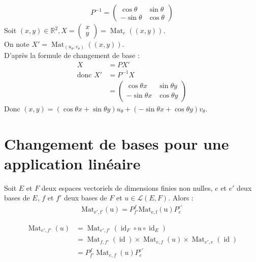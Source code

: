 \documentclass[../main.tex]{subfiles}
\begin{document}
\begin{align*}
    P^{-1} = \begin{pmatrix}
        \cos\theta & \sin\theta \\
        -\sin\theta & \cos\theta
    \end{pmatrix}
\end{align*}
Soit $(x, y)\in \mathbb{R}^2, X = \begin{pmatrix}
    x \\
    y
\end{pmatrix} = \operatorname{Mat}_e((x, y))$. \\
On note $X' = \operatorname{Mat}_{(u_\theta, v_\theta)}((x, y))$. \\
D'après la formule de changement de base : 
\begin{align*}
    X &= PX' \\
    \text{donc } X' &= P^{-1}X \\
    &= \begin{pmatrix}
        \cos\theta x & \sin\theta y \\
        -\sin\theta x & \cos\theta y
    \end{pmatrix}
\end{align*}
Donc $(x, y) = (\cos\theta x + \sin\theta y) u_\theta + (-\sin\theta x + \cos\theta y)v_\theta$. 

\section{Changement de bases pour une application linéaire}
\begin{tcolorbox}[title=Théorème 28.42, title filled=false, colframe=orange, colback=orange!10!white]
    Soit $E$ et $F$ deux espaces vectoriels de dimensions finies non nulles, $e$ et $e'$ deux bases de $E$, $f$ et $f'$ deux bases de $F$ et $u\in \mathcal{L}(E, F)$. Alors :
    \begin{align*}
        \operatorname{Mat_{e', f'}(u)} = P_{f'}^f \operatorname{Mat_{e,f}(u)} P_{e}^{e'}
    \end{align*}
\end{tcolorbox}

\begin{align*}
    \operatorname{Mat}_{e', f'}(u) &= \operatorname{Mat}_{e', f'}(\operatorname{id}_F\circ u\circ \operatorname{id}_E) \\
    &= \operatorname{Mat}_{f, f'}(\operatorname{id}) \times \operatorname{Mat}_{e, f}(u) \times \operatorname{Mat}_{e', e}(\operatorname{id}) \\
    &= P_{f'}^f \operatorname{Mat}_{e, f}(u) P_{e}^{e'}
\end{align*}
\end{document}
